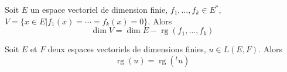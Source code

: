 \begin{cor}
Soit $E$ un espace vectoriel de dimension finie, $f_1,\ldots,f_k \in E^*$, $V = \{x \in E | f_1(x) = \cdots = f_k(x) = 0\}$. Alors
\[ \dim V = \dim E - \operatorname{rg}(f_1,\ldots,f_k) \]
\end{cor}

\begin{thm}
Soit $E$ et $F$ deux espaces vectoriels de dimensions finies, $u \in L(E,F)$. Alors 
\[ \operatorname{rg}(u) = \operatorname{rg}({}^tu) \]
\end{thm}